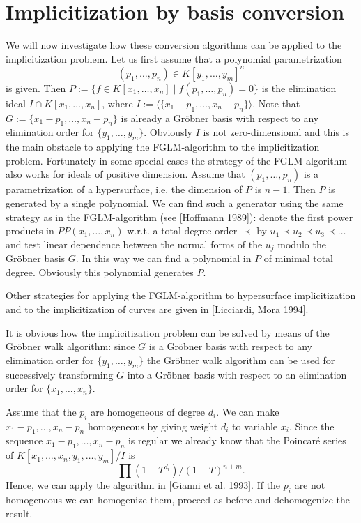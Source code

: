 \section{Implicitization by basis conversion}
We will now investigate how these conversion 
algorithms can be applied 
to the implicitization problem. Let us first assume that 
a polynomial parametrization
\[ (p_1,\ldots,p_n)\in K[y_1,\ldots,y_m]^n \]
is given. Then $P:=\{f\in K[x_1,\ldots,x_n]\mid f(p_1,\ldots,p_n)=0\}$
is the elimination ideal $I\cap K[x_1,\ldots,x_n]$, where 
$I:=\langle\{x_1-p_1,\ldots,x_n-p_n\}\rangle$. Note that 
$G:=\{x_1-p_1,\ldots,x_n-p_n\}$ is already a Gr\"obner basis 
with respect to any elimination order for $\{y_1,\ldots,y_m\}$.
Obviously $I$ is not 
zero-dimensional and this is the main obstacle to applying the FGLM-algorithm 
to the implicitization
problem. Fortunately in some special cases the strategy of the
FGLM-algorithm also works for ideals of positive dimension. Assume that
$(p_1,\ldots,p_n)$ is a parametrization of a hypersurface, i.e. the
dimension of $P$ is $n-1$. Then $P$
is generated by a single polynomial. We can find such a generator
using the same 
strategy as in the FGLM-algorithm (see [Hoffmann 1989]): 
denote the first power products in $PP(x_1,\ldots,x_n)$ w.r.t. a total
degree order $\prec$ by $u_1\prec u_2\prec u_3\prec\ldots$ and test 
linear dependence between the normal forms of the $u_j$ modulo the Gr\"obner
basis $G$. In this way we can find a polynomial in $P$ of minimal total 
degree. Obviously
this polynomial generates $P$. 

Other strategies for applying the FGLM-algorithm
to hypersurface
implicitization and to the implicitization of curves are given in 
[Licciardi, Mora 1994].

It is obvious how the implicitization problem can be solved by means 
of the Gr\"obner walk algorithm: 
since $G$ is a Gr\"obner basis with respect to any elimination 
order for $\{y_1,\ldots,y_m\}$ the Gr\"obner walk algorithm can be used for
successively transforming $G$ into
a Gr\"obner basis with respect to an elimination 
order for $\{x_1,\ldots,x_n\}$.

Assume that the $p_i$ are homogeneous of degree $d_i$. 
We can make $x_1-p_1,\ldots,x_n-p_n$
homogeneous by giving weight $d_i$ to variable $x_i$.
Since the sequence $x_1-p_1,\ldots,x_n-p_n$ is regular we already
know that the Poincar\'e series of $K[x_1,\ldots,x_n,y_1,\ldots,y_m]/I$ is
\[ \prod (1-T^{d_i})/(1-T)^{n+m}. \]
Hence, we can 
apply the algorithm in [Gianni et al. 1993]. 
If the $p_i$ are not homogeneous we can homogenize them, proceed as before
and dehomogenize the result.


